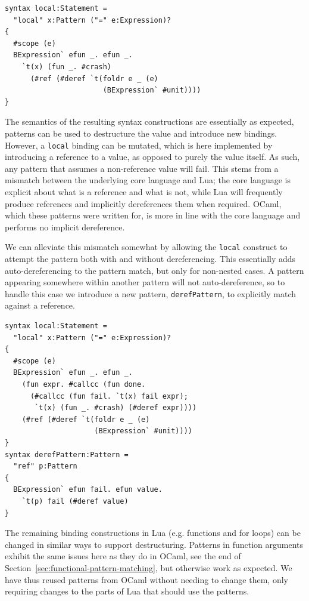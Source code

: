\documentclass{kththesis}
\begin{document}
\begin{verbatim}
syntax local:Statement =
  "local" x:Pattern ("=" e:Expression)?
{
  #scope (e)
  BExpression` efun _. efun _.
    `t(x) (fun _. #crash)
      (#ref (#deref `t(foldr e _ (e)
                       (BExpression` #unit))))
}
\end{verbatim}

The semantics of the resulting syntax constructions are essentially as expected, patterns can be used to destructure the value and introduce new bindings. However, a \texttt{local} binding can be mutated, which is here implemented by introducing a reference to a value, as opposed to purely the value itself. As such, any pattern that assumes a non-reference value will fail. This stems from a mismatch between the underlying core language and Lua; the core language is explicit about what is a reference and what is not, while Lua will frequently produce references and implicitly dereferences them when required. OCaml, which these patterns were written for, is more in line with the core language and performs no implicit dereference.

We can alleviate this mismatch somewhat by allowing the \texttt{local} construct to attempt the pattern both with and without dereferencing. This essentially adds auto-dereferencing to the pattern match, but only for non-nested cases. A pattern appearing somewhere within another pattern will not auto-dereference, so to handle this case we introduce a new pattern, \texttt{derefPattern}, to explicitly match against a reference.

\begin{verbatim}
syntax local:Statement =
  "local" x:Pattern ("=" e:Expression)?
{
  #scope (e)
  BExpression` efun _. efun _.
    (fun expr. #callcc (fun done.
      (#callcc (fun fail. `t(x) fail expr);
       `t(x) (fun _. #crash) (#deref expr))))
    (#ref (#deref `t(foldr e _ (e)
                     (BExpression` #unit))))
}
syntax derefPattern:Pattern =
  "ref" p:Pattern
{
  BExpression` efun fail. efun value.
    `t(p) fail (#deref value)
}
\end{verbatim}

The remaining binding constructions in Lua (e.g. functions and for loops) can be changed in similar ways to support destructuring. Patterns in function arguments exhibit the same issues here as they do in OCaml, see the end of Section~\ref{sec:functional-pattern-matching}, but otherwise work as expected. We have thus reused patterns from OCaml without needing to change them, only requiring changes to the parts of Lua that should use the patterns.
\end{document}
